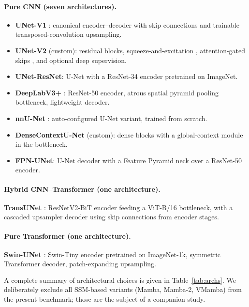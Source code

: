 \paragraph{Pure CNN (seven architectures).}
\begin{itemize}[leftmargin=*,nosep]
\item \textbf{UNet-V1} \citep{ronneberger2015}: canonical encoder--decoder
      with skip connections and trainable transposed-convolution
      upsampling.
\item \textbf{UNet-V2} (custom): residual blocks, squeeze-and-excitation
      \citep{hu2018}, attention-gated skips \citep{oktay2018}, and
      optional deep supervision.
\item \textbf{UNet-ResNet}: U-Net with a ResNet-34 encoder
      \citep{he2016} pretrained on ImageNet.
\item \textbf{DeepLabV3+} \citep{chen2018encoder}: ResNet-50 encoder,
      atrous spatial pyramid pooling bottleneck, lightweight decoder.
\item \textbf{nnU-Net} \citep{isensee2021}: auto-configured U-Net
      variant, trained from scratch.
\item \textbf{DenseContextU-Net} (custom): dense blocks
      \citep{huang2017} with a global-context module in the bottleneck.
\item \textbf{FPN-UNet}: U-Net decoder with a Feature Pyramid
      \citep{lin2017} neck over a ResNet-50 encoder.
\end{itemize}

\paragraph{Hybrid CNN--Transformer (one architecture).}
\textbf{TransUNet} \citep{chen2021transunet}: ResNetV2-BiT encoder
\citep{kolesnikov2020} feeding a ViT-B/16 bottleneck, with a cascaded
upsampler decoder using skip connections from encoder stages.

\paragraph{Pure Transformer (one architecture).}
\textbf{Swin-UNet} \citep{cao2022}: Swin-Tiny encoder
\citep{liu2021swin} pretrained on ImageNet-1k, symmetric Transformer
decoder, patch-expanding upsampling.

A complete summary of architectural choices is given in
Table~\ref{tab:archs}. We deliberately exclude all SSM-based variants
(Mamba, Mamba-2, VMamba) from the present benchmark; those are the
subject of a companion study.

